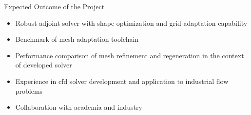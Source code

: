 
\begin{frame}{Expected Outcome of the Project}
\begin{block}{}
\begin{itemize}
\item Robust adjoint solver with shape optimization and grid adaptation capability
\item Benchmark of mesh adaptation toolchain 
\item Performance comparison of mesh refinement and regeneration in the context of developed solver
\item Experience in cfd solver development and application to industrial flow problems
\item Collaboration with academia and industry
\end{itemize}
\end{block}
\end{frame}


